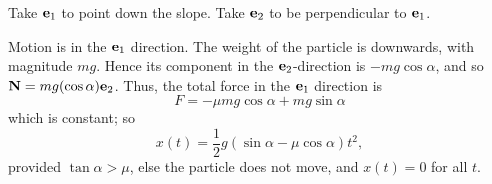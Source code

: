 \documentclass[10pt, a4paper]{article}
\begin{document}
\begin{solution}
    Take $\mathbf{e}_1$ to point down the slope.
    Take $\mathbf{e}_2$ to be perpendicular to $\mathbf{e}_1$.

    Motion is in the $\mathbf{e}_1$ direction.
    The weight of the particle is downwards,
    with magnitude $mg$.
    Hence its component in the $\mathbf{e}_2$-direction is $-mg\cos{\alpha}$,
    and so $\mathbf{N} = mg(\cos{\alpha})\mathbf{e}_2$.
    Thus,
    the total force in the $\mathbf{e}_1$ direction is
    \[
    F = -\mu mg\cos{\alpha} + mg\sin{\alpha}
    \]
    which is constant;
    so
    \[
    x(t) = \frac{1}{2}g(\sin{\alpha} - \mu\cos{\alpha})t ^ 2,
    \]
    provided $\tan{\alpha} > \mu$,
    else the particle does not move,
    and $x(t) = 0$ for all $t$.
\end{solution}
\end{document}
